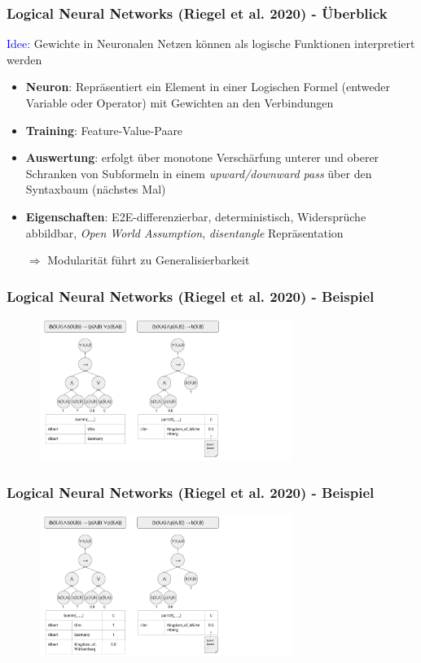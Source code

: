\documentclass[aspectratio=169]{beamer}
\begin{document}
\begin{frame}[fragile]\frametitle{Logical Neural Networks (Riegel et al. 2020) - Überblick}
\textcolor{blue}{Idee:} Gewichte in Neuronalen Netzen können als logische Funktionen interpretiert werden
\begin{itemize}
    \item \textbf{Neuron}: Repräsentiert ein Element in einer Logischen Formel (entweder Variable oder Operator) mit Gewichten an den Verbindungen
    \item \textbf{Training}: Feature-Value-Paare  
    \item \textbf{Auswertung}: erfolgt über monotone Verschärfung unterer und oberer Schranken von Subformeln in einem \textit{upward/downward pass} über den Syntaxbaum (nächstes Mal)
    \item \textbf{Eigenschaften}: E2E-differenzierbar, deterministisch, Widersprüche abbildbar, \textit{Open World Assumption}, \textit{disentangle} Repräsentation
    \item[$\Rightarrow$] Modularität führt zu Generalisierbarkeit
\end{itemize}
\end{frame}


\begin{frame}\frametitle{Logical Neural Networks (Riegel et al. 2020) - Beispiel}
\begin{figure}
    \centering
    \includegraphics[width=0.73\textwidth]{9_LNN.png}
\end{figure}
\end{frame}

\begin{frame}\frametitle{Logical Neural Networks (Riegel et al. 2020) - Beispiel}
\begin{figure}
    \centering
    \includegraphics[width=0.73\textwidth]{10_LNN.png}
\end{figure}
\end{frame}
\end{document}
